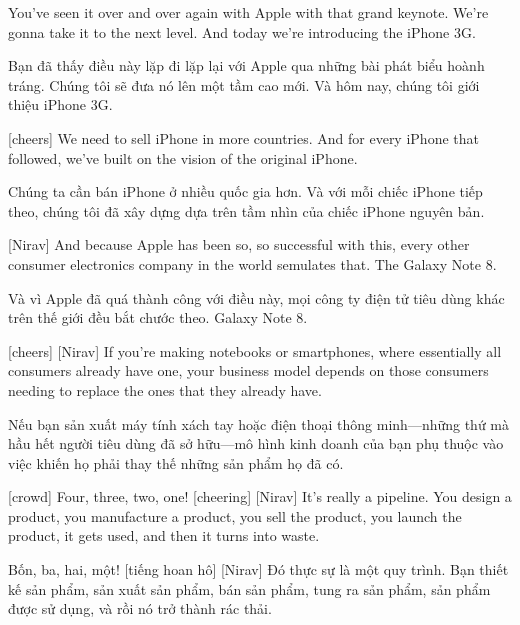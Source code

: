 \documentclass[a4paper]{article}
\begin{document}
	You've seen it over and over again with Apple with that grand keynote.
	We're gonna take it to the next level.
	And today we're introducing the iPhone 3G.
	
	\begin{vietnamese-v2}
		Bạn đã thấy điều này lặp đi lặp lại với Apple qua những bài phát biểu hoành tráng.  
		Chúng tôi sẽ đưa nó lên một tầm cao mới.  
		Và hôm nay, chúng tôi giới thiệu iPhone 3G.
	\end{vietnamese-v2}

	[cheers]
	We need to sell iPhone in more countries. And for every iPhone that followed, we've built on the vision of the original iPhone.
	
	\begin{vietnamese-v2}
		Chúng ta cần bán iPhone ở nhiều quốc gia hơn. Và với mỗi chiếc iPhone tiếp theo, chúng tôi đã xây dựng dựa trên tầm nhìn của chiếc iPhone nguyên bản.
	\end{vietnamese-v2}
	
	[Nirav] And because Apple has been so, so successful with this, every other consumer electronics company in the world semulates that.
	The Galaxy Note 8.
	
	\begin{vietnamese-v2}
		[Nirav] Và vì Apple đã quá thành công với điều này, mọi công ty điện tử tiêu dùng khác trên thế giới đều bắt chước theo.  
		Galaxy Note 8.
	\end{vietnamese-v2}
	
	
	[cheers]
	[Nirav] If you're making notebooks or smartphones, where essentially all consumers already have one, your business model depends on those consumers needing to replace the ones that they already have.
	
	\begin{vietnamese-v2}
		 Nếu bạn sản xuất máy tính xách tay hoặc điện thoại thông minh—những thứ mà hầu hết người tiêu dùng đã sở hữu—mô hình kinh doanh của bạn phụ thuộc vào việc khiến họ phải thay thế những sản phẩm họ đã có.
	\end{vietnamese-v2}
	
	[crowd] Four, three, two, one!
	[cheering]
	[Nirav] It's really a pipeline. You design a product, you manufacture a product, you sell the product, you launch the product, it gets used, and then it turns into waste.
	
	\begin{vietnamese-v2}
		 Bốn, ba, hai, một! [tiếng hoan hô] [Nirav] Đó thực sự là một quy trình. Bạn thiết kế sản phẩm, sản xuất sản phẩm, bán sản phẩm, tung ra sản phẩm, sản phẩm được sử dụng, và rồi nó trở thành rác thải.
	\end{vietnamese-v2}
	
\end{document}
